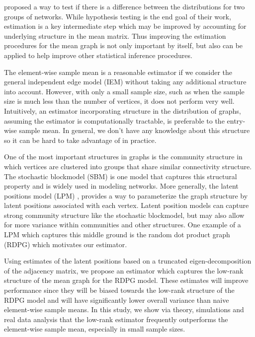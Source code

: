 \documentclass[10pt,letterpaper]{article}
\begin{document}
\citet{ginestet2014hypothesis} proposed a way to test if there is a difference between the distributions for two groups of networks.  
While hypothesis testing is the end goal of their work, estimation is a key intermediate step which may be improved by accounting for underlying structure in the mean matrix. 
Thus improving the estimation procedures for the mean graph is not only important by itself, but also can be applied to help improve other statistical inference procedures.

The element-wise sample mean is a reasonable estimator if we consider the general independent edge model (IEM) \cite{bollobas2007phasIUSe} without taking any additional structure into account. 
However, with only a small sample size, such as when the sample size is much less than the number of vertices, it does not perform very well.
Intuitively, an estimator incorporating structure in the distribution of graphs, assuming the estimator is computationally tractable, is preferable to the entry-wise sample mean. 
In general, we don't have any knowledge about this structure so it can be hard to take advantage of in practice.



One of the most important structures in graphs is the community structure in which vertices are clustered into groups that share similar connectivity structure. The stochastic blockmodel (SBM) \cite{holland1983stochastic} is one model that captures this structural property and is widely used in modeling networks.
More generally, the latent positions model (LPM) \cite{hoff2002latent}, provides a way to parameterize the graph structure by latent positions associated with each vertex. 
Latent position models can capture strong community structure like the stochastic blockmodel, but may also allow for more variance within communities and other structures.
One example of a LPM which captures this middle ground is the random dot product graph (RDPG) \cite{young2007random, nickel2007random} which motivates our estimator. 

Using estimates of the latent positions based on a truncated eigen-decomposition of the adjacency matrix, we propose an estimator which captures the low-rank structure of the mean graph for the RDPG model.
These estimates will improve performance since they will be biased towards the low-rank structure of the RDPG model and will have significantly lower overall variance than naive element-wise sample means.
In this study, we show via theory, simulations and real data analysis that the low-rank estimator frequently outperforms the element-wise sample mean, especially in small sample sizes.
\end{document}
